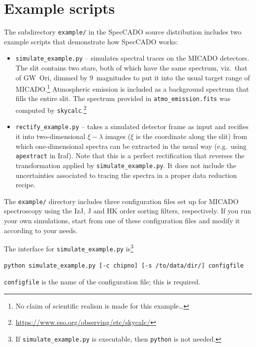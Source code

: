 \documentclass[a4paper,twoside,11pt]{article}
\begin{document}


\section{Example scripts}
\label{sec:examples}

The subdirectory \lstinline{example/} in the SpecCADO source
distribution includes two example scripts that demonstrate how
SpecCADO works:
\begin{itemize}
\item \lstinline{simulate_example.py} -- simulates spectral traces on
  the MICADO detectors. The slit contains two stars, both of which
  have the same spectrum, viz.~that of GW~Ori, dimmed by 9~magnitudes
  to put it into the usual target range of MICADO.\footnote{No claim
    of scientific realism is made for this example\dots} Atmospheric
  emission is included as a background spectrum that fills the entire
  slit. The spectrum provided in \lstinline{atmo_emission.fits} was
  computed by
  \lstinline{skycalc}.\footnote{\url{https://www.eso.org/observing/etc/skycalc/}}
\item \lstinline{rectify_example.py} -- takes a simulated detector
  frame as input and recifies it into two-dimensional $\xi-\lambda$
  images ($\xi$ is the coordinate along the slit) from which
  one-dimensional spectra can be extracted in the usual way
  (e.g.~using \lstinline{apextract} in Iraf). Note that this is a
  perfect rectification that reverses the transformation applied by
  \lstinline{simulate_example.py}. It does not include the
  uncertainties associated to tracing the spectra in a proper data
  reduction recipe.
\end{itemize}

The \lstinline{example/} directory includes three configuration files
set up for MICADO spectroscopy using the IzJ, J and HK order sorting
filters, respectively. If you run your own simulations, start from one
of these configuration files and modify it according to your needs.

The interface for \lstinline{simulate_example.py} is\footnote{If
  \lstinline{simulate_example.py} is executable, then
  \lstinline{python} is not needed.}
\begin{lstlisting}[style=csh]
python simulate_example.py [-c chipno] [-s /to/data/dir/] configfile
\end{lstlisting}
\lstinline{configfile} is the name of the configuration file; this is
required.
\end{document}
